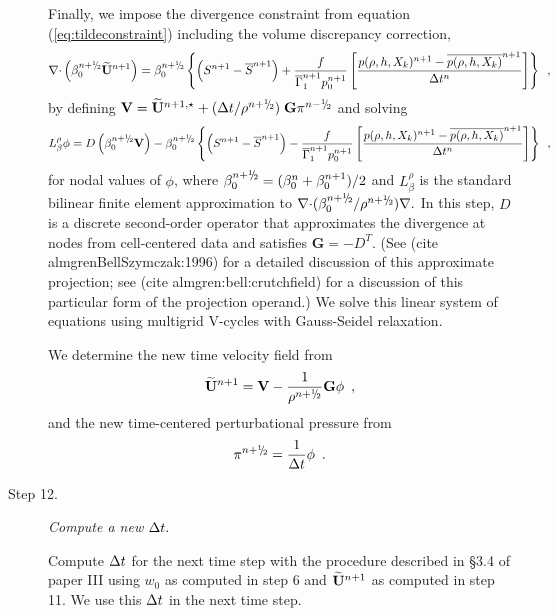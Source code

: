 \begin{description}
Finally, we impose the divergence constraint from equation (\ref{eq:tildeconstraint}) 
including the volume discrepancy correction,
\begin{equation}
\nablab \cdotb \left(\beta_0^{\nph} \Ubt^{n+1} \right)  = \beta_0^{\nph}\left\{  \left(S^{n+1} - \overline{S}^{n+1} \right)
+ \frac{f}{\gammabar^{n+1} p_0^{n+1}}
\left[\frac{p(\rho,h,X_k)^{n+1} - \overline{p(\rho,h,X_k)}^{n+1}}{\Delta t^n}\right]\right\}
\enskip,
\end{equation}
by defining ${\bf V} = \Ubt^{n+1,\star} + ( \dt / \rho^\nph ) \; \mathbf{G} \pi^\nmh$ 
and solving
\begin{equation}
 L_\beta^\rho \phi =
   D \left ( \beta_0^{\nph} {\bf V} \right) - \beta_0^{\nph}\left\{ \left(S^{n+1}-\overline{S}^{n+1} \right)
- \frac{f}{\gammabar^{n+1} p_0^{n+1}}
\left[\frac{p(\rho,h,X_k)^{n+1} - \overline{p(\rho,h,X_k)}^{n+1}}{\Delta t^n}\right]\right\} \enskip,
\end{equation}
for nodal values of $\phi$, where
$\beta_0^\nph = ( \beta_0^n + \beta_0^{n+1} )/2$ and
$L_\beta^\rho$ is the standard bilinear
finite element approximation to $\nablab \cdotb ({\beta_0^\nph}/{\rho^\nph}) \nablab.$
In this step, $D$ is a discrete second-order operator that approximates the 
divergence at nodes from cell-centered data and satisfies
$\mathbf{G} = -D^T.$ 
(See (cite almgrenBellSzymczak:1996) for a detailed discussion of this
approximate projection; see (cite almgren:bell:crutchfield) for a discussion
of this particular form of the projection operand.)  
We solve this linear system of equations using multigrid V-cycles with 
Gauss-Seidel relaxation.

We determine the new time velocity field from
\begin{equation}
\Ubt^{n+1} = {\bf V} - \frac{1}{\rho^\nph} \mathbf{G} \phi \enskip ,
\end{equation}
and the new time-centered perturbational pressure from
\begin{equation}
  \pi^\nph = \frac{1}{\dt} \phi \enskip .
\end{equation}

\item[Step 12.] {\em Compute a new $\Delta t.$}

Compute $\Delta t$ for the next time step with the procedure described in \S 3.4 of paper III
using $w_0$ as computed in step 6 and
$\widetilde{{\bf U}}^{n+1}$ as computed in step 11.  We use this $\Delta t$ in the next time step. 


\end{description}

